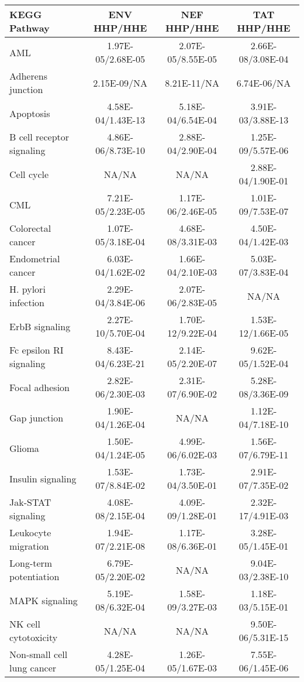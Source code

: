 \begin{table}\footnotesize
\begin{center}
  \begin{tabular}{|l|c|c|c|}
  \hline
  KEGG Pathway & ENV HHP/HHE & NEF HHP/HHE & TAT HHP/HHE\\
  \hline
AML & 1.97E-05/2.68E-05 & 2.07E-05/8.55E-05 & 2.66E-08/3.08E-04 \\
Adherens junction & 2.15E-09/NA & 8.21E-11/NA & 6.74E-06/NA \\
Apoptosis & 4.58E-04/1.43E-13 & 5.18E-04/6.54E-04 & 3.91E-03/3.88E-13 \\
B cell receptor signaling & 4.86E-06/8.73E-10 & 2.88E-04/2.90E-04 & 1.25E-09/5.57E-06 \\
Cell cycle & NA/NA & NA/NA & 2.88E-04/1.90E-01 \\
CML & 7.21E-05/2.23E-05 & 1.17E-06/2.46E-05 & 1.01E-09/7.53E-07 \\
Colorectal cancer & 1.07E-05/3.18E-04 & 4.68E-08/3.31E-03 & 4.50E-04/1.42E-03 \\
Endometrial cancer & 6.03E-04/1.62E-02 & 1.66E-04/2.10E-03 & 5.03E-07/3.83E-04 \\
H. pylori infection & 2.29E-04/3.84E-06 & 2.07E-06/2.83E-05 & NA/NA \\
ErbB signaling & 2.27E-10/5.70E-04 & 1.70E-12/9.22E-04 & 1.53E-12/1.66E-05 \\
Fc epsilon RI signaling & 8.43E-04/6.23E-21 & 2.14E-05/2.20E-07 & 9.62E-05/1.52E-04 \\
Focal adhesion & 2.82E-06/2.30E-03 & 2.31E-07/6.90E-02 & 5.28E-08/3.36E-09 \\
Gap junction & 1.90E-04/1.26E-04 & NA/NA & 1.12E-04/7.18E-10 \\
Glioma & 1.50E-04/1.24E-05 & 4.99E-06/6.02E-03 & 1.56E-07/6.79E-11 \\
Insulin signaling & 1.53E-07/8.84E-02 & 1.73E-04/3.50E-01 & 2.91E-07/7.35E-02 \\
Jak-STAT signaling & 4.08E-08/2.15E-04 & 4.09E-09/1.28E-01 & 2.32E-17/4.91E-03 \\
Leukocyte migration & 1.94E-07/2.21E-08 & 1.17E-08/6.36E-01 & 3.28E-05/1.45E-01 \\
Long-term potentiation & 6.79E-05/2.20E-02 & NA/NA & 9.04E-03/2.38E-10 \\
MAPK signaling & 5.19E-08/6.32E-04 & 1.58E-09/3.27E-03 & 1.18E-03/5.15E-01 \\
NK cell cytotoxicity & NA/NA & NA/NA & 9.50E-06/5.31E-15 \\
Non-small cell lung cancer & 4.28E-05/1.25E-04 & 1.26E-05/1.67E-03 & 7.55E-06/1.45E-06 \\

\end{tabular}
\end{center}
\end{table}
